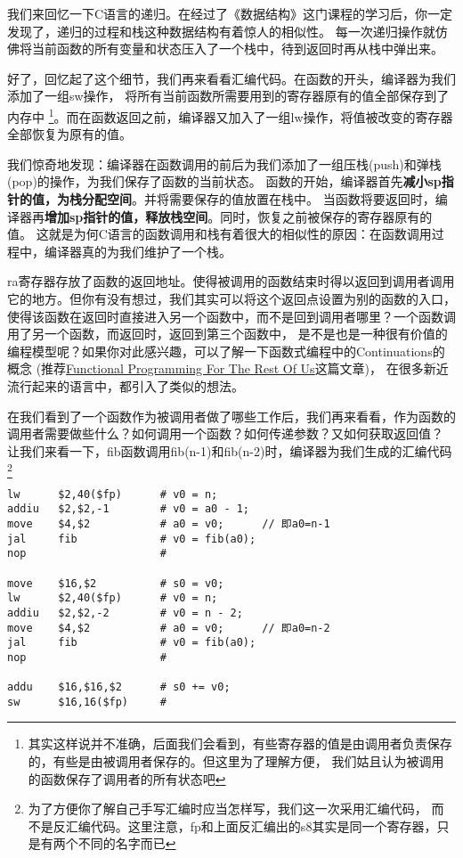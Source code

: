 我们来回忆一下C语言的递归。在经过了《数据结构》这门课程的学习后，你一定发现了，递归的过程和栈这种数据结构有着惊人的相似性。
每一次递归操作就仿佛将当前函数的所有变量和状态压入了一个栈中，待到返回时再从栈中弹出来。

好了，回忆起了这个细节，我们再来看看汇编代码。在函数的开头，编译器为我们添加了一组sw操作，
将所有当前函数所需要用到的寄存器原有的值全部保存到了内存中
\footnote{其实这样说并不准确，后面我们会看到，有些寄存器的值是由调用者负责保存的，有些是由被调用者保存的。但这里为了理解方便，
我们姑且认为被调用的函数保存了调用者的所有状态吧}。而在函数返回之前，编译器又加入了一组lw操作，将值被改变的寄存器全部恢复为原有的值。

我们惊奇地发现：编译器在函数调用的前后为我们添加了一组压栈(push)和弹栈(pop)的操作，为我们保存了函数的当前状态。
函数的开始，编译器首先\textbf{减小sp指针的值，为栈分配空间}。并将需要保存的值放置在栈中。
当函数将要返回时，编译器再\textbf{增加sp指针的值，释放栈空间}。同时，恢复之前被保存的寄存器原有的值。
这就是为何C语言的函数调用和栈有着很大的相似性的原因：在函数调用过程中，编译器真的为我们维护了一个栈。

\begin{note}
ra寄存器存放了函数的返回地址。使得被调用的函数结束时得以返回到调用者调用它的地方。但你有没有想过，我们其实可以将这个返回点设置为别的函数的入口，
使得该函数在返回时直接进入另一个函数中，而不是回到调用者哪里？一个函数调用了另一个函数，而返回时，返回到第三个函数中，
是不是也是一种很有价值的编程模型呢？如果你对此感兴趣，可以了解一下函数式编程中的Continuations的概念
(推荐\href{https://github.com/justinyhuang/Functional-Programming-For-The-Rest-of-Us-Cn/blob/master/FunctionalProgrammingForTheRestOfUs.cn.md}
{Functional Programming For The Rest Of Us}这篇文章)，
在很多新近流行起来的语言中，都引入了类似的想法。
\end{note}

在我们看到了一个函数作为被调用者做了哪些工作后，我们再来看看，作为函数的调用者需要做些什么？如何调用一个函数？如何传递参数？又如何获取返回值？
让我们来看一下，fib函数调用fib(n-1)和fib(n-2)时，编译器为我们生成的汇编代码\footnote{为了方便你了解自己手写汇编时应当怎样写，我们这一次采用汇编代码，
而不是反汇编代码。这里注意，fp和上面反汇编出的s8其实是同一个寄存器，只是有两个不同的名字而已}

\begin{verbatim}
lw      $2,40($fp)      # v0 = n;
addiu   $2,$2,-1        # v0 = a0 - 1;
move    $4,$2           # a0 = v0;      // 即a0=n-1
jal     fib             # v0 = fib(a0);
nop                     #

move    $16,$2          # s0 = v0;
lw      $2,40($fp)      # v0 = n;
addiu   $2,$2,-2        # v0 = n - 2;
move    $4,$2           # a0 = v0;      // 即a0=n-2
jal     fib             # v0 = fib(a0);
nop                     #

addu    $16,$16,$2      # s0 += v0;
sw      $16,16($fp)     #
\end{verbatim}

